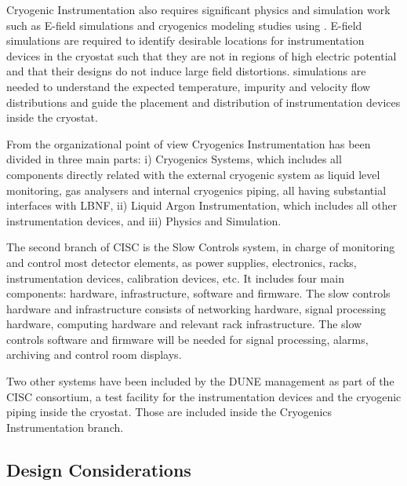 Cryogenic Instrumentation also requires significant physics and
simulation work such as E-field simulations and cryogenics modeling
studies using . E-field simulations
are required to identify desirable locations for instrumentation
devices in the cryostat such that they are not in regions of high electric potential and
that their designs do not induce large field distortions. 
simulations are needed to understand the expected temperature,
impurity and velocity flow distributions and guide the placement and
distribution of instrumentation devices inside the cryostat.


From the organizational point of view
Cryogenics Instrumentation has been divided in three main parts: i) Cryogenics Systems, which includes all components directly related with the external cryogenic system as
liquid level monitoring, gas analysers and internal cryogenics piping, all having substantial interfaces with LBNF, ii) Liquid Argon Instrumentation, which includes all
other instrumentation devices, and iii) Physics and Simulation.


The second branch of CISC is the Slow Controls system, in charge of monitoring and control most detector elements, as power supplies, electronics, racks, instrumentation devices,
calibration devices, etc. It includes four main components: hardware, infrastructure,
software and firmware. The slow controls hardware and infrastructure consists of
networking hardware, signal processing hardware, computing hardware and relevant
rack infrastructure. The slow controls software and firmware will be needed for
signal processing, alarms, archiving and control room displays.

Two other systems have been included by the DUNE management as part of the CISC consortium,
a test facility for the instrumentation devices and the cryogenic piping inside the cryostat.
Those are included inside the Cryogenics Instrumentation branch.



\subsection{Design Considerations}
\label{sec:fddp-slow-cryo-des-consid}

